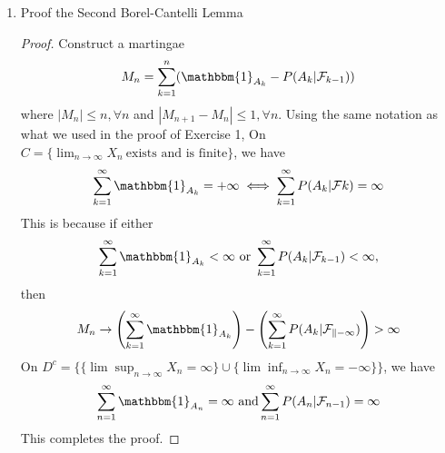 \documentclass[10pt]{article}
\begin{document}
\begin{enumerate}
\begin{proof}
\end{proof}
\item Proof the Second Borel-Cantelli Lemma
\begin{proof}
Construct a martingae $$M_n=\sum_{k=1}^n(\mathbbm{1}_{A_k}-P(A_k|\mathcal{F}_{k-1}))$$ where $|M_n|\le n, \forall n$ and $|M_{n+1}-M_n|\le 1, \forall n$.
Using the same notation as what we used in the proof of Exercise 1, On $C=\{\lim_{n \to \infty}X_n \ \text{exists and is finite}\}$, we have $$\sum_{k=1}^{\infty}\mathbbm{1}_{A_k}=+\infty \iff \sum_{k=1}^{\infty}P(A_k|\mathcal{F}k)=\infty$$ This is because if either $$\sum_{k=1}^{\infty}\mathbbm{1}_{A_k}<\infty \ \text{or}\ \sum_{k=1}^{\infty}P(A_k|\mathcal{F}_{k-1})<\infty,$$ then $$M_n \to \left(\sum_{k=1}^{\infty}\mathbbm{1}_{A_k}\right)-\left(\sum_{k=1}^{\infty}P(A_k|\mathcal{F_{k-1}})\right)>\infty$$
On $D^c=\{\{\lim \sup_{n \to \infty}X_n=\infty\}\cup \{\lim \inf_{n \to \infty} X_n=-\infty\}\}$, we have $$\sum_{n=1}^{\infty}\mathbbm{1}_{A_n}=\infty \ \text{and} \sum_{n=1}^{\infty}P(A_n|\mathcal{F}_{n-1})=\infty$$
This completes the proof.
\end{proof}


\end{enumerate}
\end{document}
